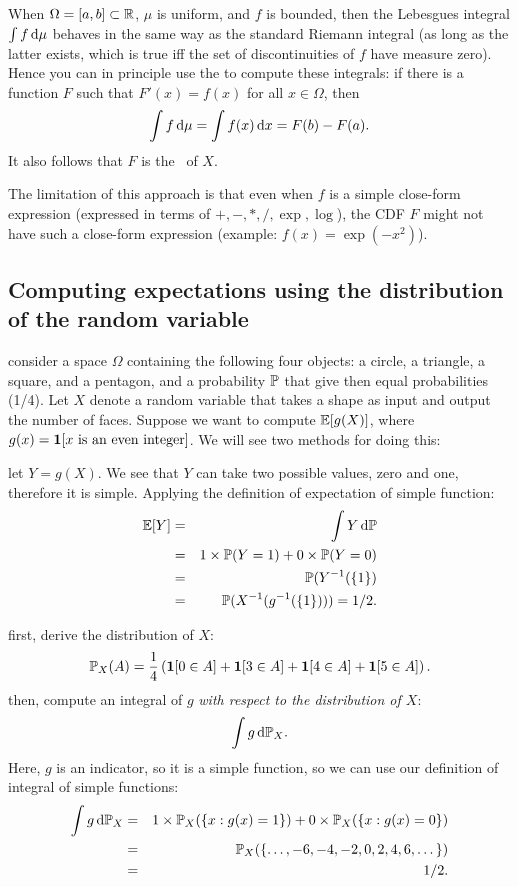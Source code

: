 \documentclass{article}
\begin{document}
When $\Omega = [a, b] \subset \R$, $\mu$ is uniform, and $f$ is bounded, then the Lebesgues integral $\int f \ud \mu$ behaves in the same way as the standard Riemann integral (as long as the latter exists, which is true iff the set of discontinuities of $f$ have measure zero). Hence you can in principle use the  to compute these integrals: if there is a function $F$ such that $F'(x) = f(x)$ for all $x \in \Omega$, then 
\[ \int f \ud \mu = \int f(x) \ud x = F(b) - F(a). \]
It also follows that $F$ is the \CDF\ of $X$.  

The limitation of this approach is that even when $f$ is a simple close-form expression (expressed in terms of $+, -, *, /, \exp, \log$), the CDF $F$ might not have such a close-form expression (example: $f(x) = \exp(-x^2)$).


\subsection{Computing expectations using the distribution of the random variable}\label{sec:change-of-var}

 consider a space $\Omega$ containing the following four objects: a circle, a triangle, a square, and a pentagon, and a probability $\P$ that give then equal probabilities (1/4). Let $X$ denote a random variable that takes a shape as input and output the number of faces. Suppose we want to compute $\E[g(X)]$, where $g(x) = \1[x \text{ is an even integer}]$. We will see two methods for doing this:

 let $Y = g(X)$. We see that $Y$ can take two possible values, zero and one, therefore it is simple. Applying the definition of expectation of simple function:
\begin{eqnarray*} 
\E[Y] &=& \int Y \ud \P \\
&=& 1\times \P(Y = 1) + 0\times \P(Y = 0) \\
&=& \P(Y^{-1}(\{1\}) \\
&=& \P(X^{-1}(g^{-1}(\{1\}))) = 1/2.
\end{eqnarray*}

 first, derive the distribution of $X$:
\[ \P_X(A) = \frac{1}{4}\left( \1[0 \in A] + \1[3 \in A] + \1[4 \in A] + \1[5 \in A] \right). \]
then, compute an integral of $g$ \emph{with respect to the distribution of $X$}:
\[ \int g \ud \P_X. \]
Here, $g$ is an indicator, so it is a simple function, so we can use our definition of integral of simple functions:
\begin{eqnarray*}
\int g \ud \P_X &=& 1 \times \P_X(\{x : g(x) = 1\}) + 0 \times \P_X(\{x : g(x) = 0\}) \\
&=& \P_X(\{\dots, -6, -4, -2, 0, 2, 4, 6, \dots\}) \\
&=& 1/2.
\end{eqnarray*}
\end{document}

